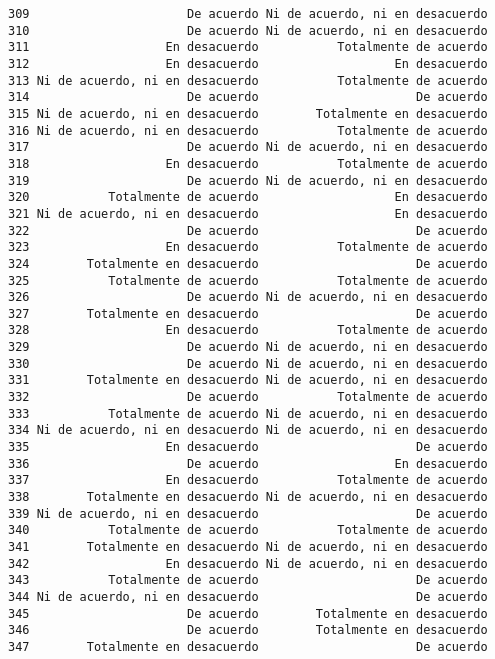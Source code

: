 \documentclass[
  letterpaper,
  DIV=11,
  numbers=noendperiod]{scrartcl}
\begin{document}
\begin{verbatim}
309                      De acuerdo Ni de acuerdo, ni en desacuerdo
310                      De acuerdo Ni de acuerdo, ni en desacuerdo
311                   En desacuerdo           Totalmente de acuerdo
312                   En desacuerdo                   En desacuerdo
313 Ni de acuerdo, ni en desacuerdo           Totalmente de acuerdo
314                      De acuerdo                      De acuerdo
315 Ni de acuerdo, ni en desacuerdo        Totalmente en desacuerdo
316 Ni de acuerdo, ni en desacuerdo           Totalmente de acuerdo
317                      De acuerdo Ni de acuerdo, ni en desacuerdo
318                   En desacuerdo           Totalmente de acuerdo
319                      De acuerdo Ni de acuerdo, ni en desacuerdo
320           Totalmente de acuerdo                   En desacuerdo
321 Ni de acuerdo, ni en desacuerdo                   En desacuerdo
322                      De acuerdo                      De acuerdo
323                   En desacuerdo           Totalmente de acuerdo
324        Totalmente en desacuerdo                      De acuerdo
325           Totalmente de acuerdo           Totalmente de acuerdo
326                      De acuerdo Ni de acuerdo, ni en desacuerdo
327        Totalmente en desacuerdo                      De acuerdo
328                   En desacuerdo           Totalmente de acuerdo
329                      De acuerdo Ni de acuerdo, ni en desacuerdo
330                      De acuerdo Ni de acuerdo, ni en desacuerdo
331        Totalmente en desacuerdo Ni de acuerdo, ni en desacuerdo
332                      De acuerdo           Totalmente de acuerdo
333           Totalmente de acuerdo Ni de acuerdo, ni en desacuerdo
334 Ni de acuerdo, ni en desacuerdo Ni de acuerdo, ni en desacuerdo
335                   En desacuerdo                      De acuerdo
336                      De acuerdo                   En desacuerdo
337                   En desacuerdo           Totalmente de acuerdo
338        Totalmente en desacuerdo Ni de acuerdo, ni en desacuerdo
339 Ni de acuerdo, ni en desacuerdo                      De acuerdo
340           Totalmente de acuerdo           Totalmente de acuerdo
341        Totalmente en desacuerdo Ni de acuerdo, ni en desacuerdo
342                   En desacuerdo Ni de acuerdo, ni en desacuerdo
343           Totalmente de acuerdo                      De acuerdo
344 Ni de acuerdo, ni en desacuerdo                      De acuerdo
345                      De acuerdo        Totalmente en desacuerdo
346                      De acuerdo        Totalmente en desacuerdo
347        Totalmente en desacuerdo                      De acuerdo

\end{verbatim}
\end{document}
